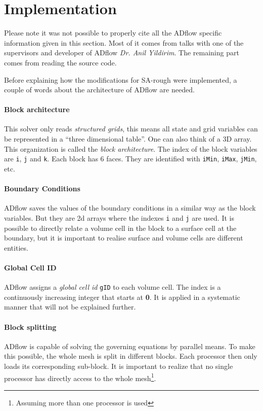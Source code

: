 \section{Implementation}
Please note it was not possible to properly cite all the ADflow specific
information given in this section. Most of it comes from talks with one of the
supervisors and developer of ADflow \textit{Dr. Anil Yildirim}. The remaining
part comes from reading the source code.

Before explaining how the modifications for SA-rough were implemented, a couple
of words about the architecture of ADflow are needed.

\paragraph{Block architecture}
This solver only reads \textit{structured grids}, this means all state and grid
variables can be represented in a ``three dimensional table''. One can also think
of a 3D array. This organization is called the \textit{block architecture}. The
index of the block variables are \texttt{i}, \texttt{j} and \texttt{k}. Each
block has 6 faces. They are identified with \texttt{iMin}, \texttt{iMax}, \texttt{jMin}, etc.

\paragraph{Boundary Conditions}
ADflow saves the values of the boundary conditions in a similar way as the block
variables. But they are 2d arrays where the indexes \texttt{i} and \texttt{j}
are used. It is possible to directly relate a volume cell in the block to a
surface cell at the boundary, but it is important to realise surface and volume
cells are different entities.

\paragraph{Global Cell ID}
ADflow assigns a \textit{global cell id} \texttt{gID} to each volume cell. The
index is a continuously increasing integer that starts at \textbf{0}. It is
applied in a systematic manner that will not be explained further.

\paragraph{Block splitting}
ADflow is capable of solving the governing equations by parallel means. To make
this possible, the whole mesh is split in different blocks. Each processor then
only loads its corresponding sub-block. It is important to realize that no
single processor has directly access to the whole mesh\footnote{Assuming more than one processor is used}.

